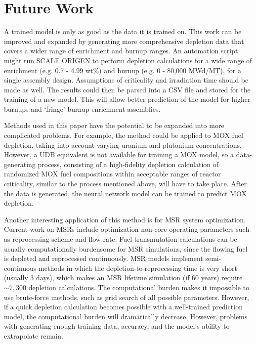\section{Future Work}

A trained model is only as good as the data it is trained on.
This work can be improved and expanded by generating
more comprehensive depletion data that covers a wider
range of enrichment and burnup ranges. An automation
script might run SCALE ORIGEN to perform depletion calculations
for a wide range of enrichment (e.g. 0.7 - 4.99 wt\%) and burnup (e.g. 0 - 80,000 MWd/MT),
for a single assembly design. Assumptions of criticality
and irradiation time should be made as well. The results
could then be parsed into a \gls{CSV} file and stored for
the training of a new model. This will allow better
prediction of the model for higher burnups and `fringe'
burnup-enrichment assemblies.

Methods used in this paper have the potential to be expanded into more
complicated problems. For example, the method
could be applied to \gls{MOX} fuel depletion, taking
into account varying uranium and plutonium concentrations.
However, a \gls{UDB} equivalent is not available
for training a \gls{MOX} model, so a
data-generating process, consisting of a high-fidelity
depletion calculation of randomized \gls{MOX} fuel
compositions within acceptable ranges of reactor
criticality, similar to the process mentioned above,
will have to take place. After the data
is generated, the neural network model can be trained
to predict \gls{MOX} depletion.

Another interesting application of this method is for
\gls{MSR} system optimization. Current work on
\glspl{MSR} include optimization non-core operating
parameters such as reprocessing scheme and flow rate.
Fuel transmutation calculations
can be usually computationally burdensome for \gls{MSR}
simulations, since the flowing fuel is depleted and
reprocessed continuously. \gls{MSR} models implement semi-continuous
methods in which the depletion-to-reprocessing time is
very short (usually 3 days), which makes an
\gls{MSR} lifetime simulation (if 60 years)
require $\sim 7,300$ depletion calculations.
The computational burden
makes it impossible to use brute-force methods,
such as grid search of all possible parameters.
However, if a quick depletion calculation becomes possible
with a well-trained prediction model, the
computational burden will dramatically decrease.
However, problems with generating enough
training data, accuracy, and the model's ability to
extrapolate remain.